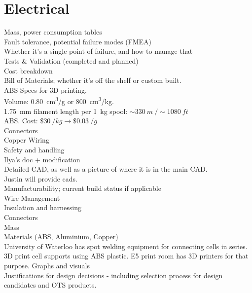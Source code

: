 \documentclass[main.tex]{subfile}
\begin{document}
    \section{Electrical}
    Mass, power consumption tables\\
    Fault tolerance, potential failure modes (FMEA)\\
    Whether it’s a single point of failure, and how to manage that\\
    Tests \& Validation (completed and planned)\\
    Cost breakdown\\
    Bill of Materials; whether it’s off the shelf or custom built.\\

    ABS Specs for 3D printing.\\
    Volume: \SI{0.80}{cm^3/g} or \SI{800}{cm^3/kg}.\\
    \SI{1.75}{mm} filament length per \SI{1}{kg} spool: $\sim \SI{330}{m}\ / \sim \SI{1080}{ft}$\\
    ABS. Cost: $\$\SI{30}{/kg} \rightarrow \$\SI{0.03}{/g}$\\

    Connectors\\

    Copper Wiring\\




    Safety and handling\\
    Ilya’s doc + modification\\
    Detailed CAD, as well as a picture of where it is in the main CAD.\\
    Justin will provide cads. \\
    Manufacturability; current build status if applicable\\
    Wire Management\\
    Insulation and harnessing\\
    Connectors\\
    Mass \\
    Materials (ABS, Aluminium, Copper)\\


    University of Waterloo has spot welding equipment for connecting cells in series.
    3D print cell supports using ABS plastic. E5 print room has 3D printers for that purpose.
    Graphs and visuals\\

    Justifications for design decisions - including selection process for design candidates and OTS products.\\
\end{document}
